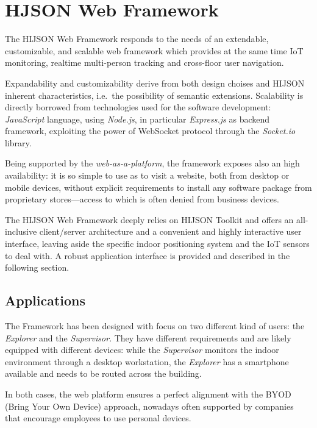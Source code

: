 \section{HJSON Web Framework}\label{hjson-web-framework}

The HIJSON Web Framework responds to the needs of an extendable,
customizable, and scalable web framework which provides at the same time IoT
monitoring, realtime multi-person tracking and cross-floor user
navigation.

Expandability and customizability derive from both design choises and
HIJSON inherent characteristics, i.e.~the possibility of semantic extensions.
Scalability is directly borrowed from technologies used for the
software development: \emph{JavaScript} language, using \emph{Node.js},
in particular \emph{Express.js} as backend framework, exploiting the
power of WebSocket protocol through the \emph{Socket.io} library.

Being supported by the \emph{web-as-a-platform}, the framework exposes
also an high availability: it is so simple to use as to visit a
website, both from desktop or mobile devices, without explicit
requirements to install any software package from proprietary stores---access to
which is often denied from business devices.

The HIJSON Web Framework deeply relies on HIJSON Toolkit and offers an
all-inclusive client/server architecture and a convenient and highly interactive
user interface, leaving aside the specific indoor positioning system and
the IoT sensors to deal with. A robust application interface is provided and
described in the following section.

\subsection{Applications}\label{applications}

The Framework has been designed with focus on two different kind of
users: the \emph{Explorer} and the \emph{Supervisor}. They have
different requirements and are likely equipped with different devices:
while the \emph{Supervisor} monitors the indoor environment through a
desktop workstation, the \emph{Explorer} has a smartphone available and
needs to be routed across the building.

In both cases, the web platform ensures a perfect alignment with the
BYOD (Bring Your Own Device) approach, nowadays often supported by companies
that encourage employees to use personal devices.

